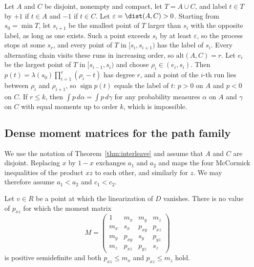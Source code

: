 Let $A$ and $C$ be disjoint, nonempty and compact, let $T=A\cup C$, and
label $t\in T$ by $+1$ if $t\in A$ and $-1$ if $t\in C$. Let
$\varepsilon=\dist(A,C)>0$. Starting from $s_0=\min T$, let $s_{i+1}$ be the
smallest point of $T$ larger than $s_i$ with the opposite label, as long
as one exists. Such a point exceeds $s_i$ by at least $\varepsilon$, so
the process stops at some $s_r$, and every point of $T$ in $[s_i,s_{i+1})$
has the label of $s_i$. Every alternating chain visits these runs in
increasing order, so $\mathrm{alt}(A,C)=r$. Let $e_i$ be the largest point
of $T$ in $[s_{i-1},s_i)$ and choose $\rho_i\in(e_i,s_i)$. Then
$p(t)=\lambda(s_0)\prod_{i=1}^r(\rho_i-t)$ has degree $r$, and a point of the
$i$-th run lies between $\rho_i$ and $\rho_{i+1}$, so
$\operatorname{sign}p(t)$ equals the label of $t$: $p>0$ on $A$ and $p<0$ on
$C$. If $r\le k$, then $\int p\,d\alpha=\int p\,d\gamma$ for any probability
measures $\alpha$ on $A$ and $\gamma$ on $C$ with equal moments up to order
$k$, which is impossible.

\subsection{Dense moment matrices for the path family}\label{app:sdp}

We use the notation of Theorem~\ref{thm:interleave} and assume that $A$
and $C$ are disjoint. Replacing $x$ by $1-x$ exchanges $a_1$ and $a_2$ and
maps the four McCormick inequalities of the product $xz$ to each other,
and similarly for $z$. We may therefore assume $a_1<a_2$ and $c_1<c_2$.

\begin{proposition}\label{prop:sdp}
Let $v\in R$ be a point at which the linearization of $D$ vanishes.
There is no value of $p_{xz}$ for which the moment matrix
\[
M=\begin{pmatrix}1&m_x&m_y&m_z\\ m_x&s_x&p_{xy}&p_{xz}\\ m_y&p_{xy}&s_y&p_{yz}\\ m_z&p_{xz}&p_{yz}&s_z\end{pmatrix}
\]
is positive semidefinite and both $p_{xz}\le m_x$ and $p_{xz}\le m_z$ hold.
\end{proposition}

